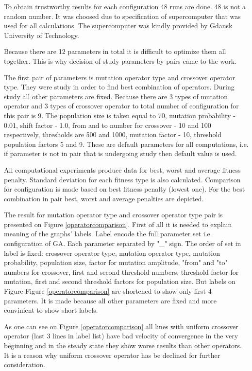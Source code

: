 \documentclass[12pt]{report}
\begin{document}
To obtain trustworthy results for each configuration 48 runs are done. 48 is not a random number. It was choosed due to specification of supercomputer that was used for all calculations. The supercomputer was kindly provided by Gdansk University of Technology.

Because there are 12 parameters in total it is difficult to optimize them all together. This is why decision of study parameters by pairs came to the work. 

The first pair of parameters is mutation operator type and crossover operator type. They were study in order to find best combination of operators. During study all other parameters are fixed. Because there are 3 types of mutation operator and 3 types of crossover operator to total number of configuration for this pair is 9. The population size is taken equal to 70, mutation probability - 0.01, shift factor - 1.0, from and to number for crossover - 10 and 100 respectively, thresholds are 500 and 1000, mutation factor - 10, threshold population factors 5 and 9. These are default parameters for all computations, i.e. if parameter is not in pair that is undergoing study then default value is used.

All computational experiments produce data for best, worst and average fitness penalty. Standard deviation for each fitness type is also calculated. Comparison for configuration is made based on best fitness penalty (lowest one). For the best combination in pair best, worst and average penalties are depicted.

The result for mutation operator type and crossover operator type pair is presented on Figure \ref{operatorcomparison}. First of all it is needed to explain meaning of the graphs' labels. Label encode the full parameter set i.e. configuration of GA. Each parameter separated by "\_" sign. The order of set in label is fixed: crossover operator type, mutation operator type, mutation probability, population size, factor for mutation amplitude, "from" and "to" numbers for crossover, first and second threshold numbers, threshold factor for mutation, first and second threshold factors for population size. But labels on Figure Figure \ref{operatorcomparison} are shortened to show only first 4 parameters. It is made because all other parameters are fixed and more convinient to show short labels.

As one can see on Figure \ref{operatorcomparison} all lines with uniform crossover operator (last 3 lines in label list) have bad velocity of convergence in the very beginning and in the steady state they show worse results than other operators. It is a reason why uniform crossover operator has be declined for further consideration.
\end{document}
